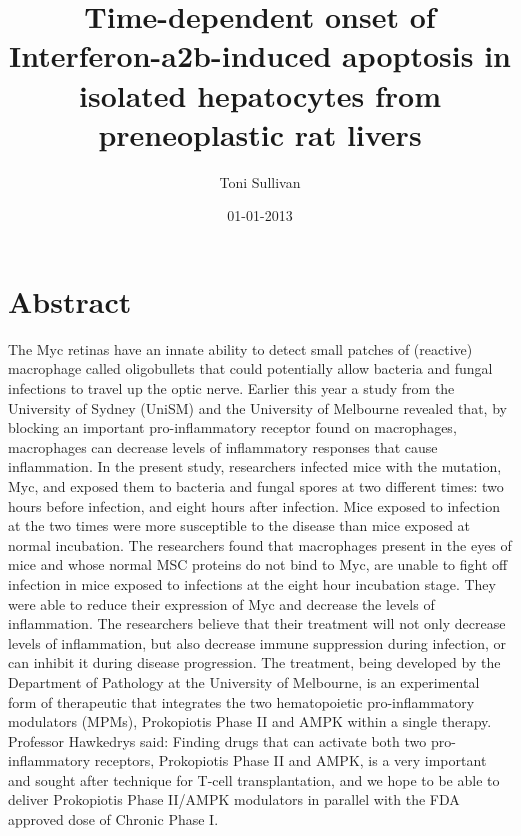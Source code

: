 \documentclass{article}%
\title{Time{-}dependent onset of Interferon{-}a2b{-}induced apoptosis in isolated hepatocytes from preneoplastic rat livers}%
\author{Toni Sullivan}%
\affil{Department of Surgery, University of Wisconsin Hospital and Clinics, Madison, Wisconsin, United States of America}%
\date{01{-}01{-}2013}%
\begin{document}
%
\normalsize%
\maketitle%
\section{Abstract}%
\label{sec:Abstract}%
The Myc retinas have an innate ability to detect small patches of (reactive) macrophage called oligobullets that could potentially allow bacteria and fungal infections to travel up the optic nerve.\newline%
Earlier this year a study from the University of Sydney (UniSM) and the University of Melbourne revealed that, by blocking an important pro{-}inflammatory receptor found on macrophages, macrophages can decrease levels of inflammatory responses that cause inflammation.\newline%
In the present study, researchers infected mice with the mutation, Myc, and exposed them to bacteria and fungal spores at two different times: two hours before infection, and eight hours after infection. Mice exposed to infection at the two times were more susceptible to the disease than mice exposed at normal incubation.\newline%
The researchers found that macrophages present in the eyes of mice and whose normal MSC proteins do not bind to Myc, are unable to fight off infection in mice exposed to infections at the eight hour incubation stage. They were able to reduce their expression of Myc and decrease the levels of inflammation.\newline%
The researchers believe that their treatment will not only decrease levels of inflammation, but also decrease immune suppression during infection, or can inhibit it during disease progression.\newline%
The treatment, being developed by the Department of Pathology at the University of Melbourne, is an experimental form of therapeutic that integrates the two hematopoietic pro{-}inflammatory modulators (MPMs), Prokopiotis Phase II and AMPK within a single therapy.\newline%
Professor Hawkedrys said: Finding drugs that can activate both two pro{-}inflammatory receptors, Prokopiotis Phase II and AMPK, is a very important and sought after technique for T{-}cell transplantation, and we hope to be able to deliver Prokopiotis Phase II/AMPK modulators in parallel with the FDA approved dose of Chronic Phase I.\newline%
\end{document}
